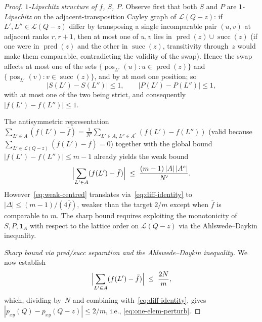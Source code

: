 \begin{proof}
\smallskip\noindent\emph{$1$-Lipschitz structure of $f$, $S$, $P$.}
Observe first that both $S$ and $P$ are \emph{$1$-Lipschitz} on the
adjacent-transposition Cayley graph of $\mathcal L(Q-z)$: if
$L', L'' \in \mathcal L(Q-z)$ differ by transposing a single
incomparable pair $(u, v)$ at adjacent ranks $r, r+1$, then at most
one of $u, v$ lies in $\operatorname{pred}(z) \cup \operatorname{succ}(z)$
(if one were in $\operatorname{pred}(z)$ and the other in
$\operatorname{succ}(z)$, transitivity through~$z$ would make them
comparable, contradicting the validity of the swap). Hence the swap
affects at most one of the sets
$\{\operatorname{pos}_{L'}(u) : u \in \operatorname{pred}(z)\}$ and
$\{\operatorname{pos}_{L'}(v) : v \in \operatorname{succ}(z)\}$, and
by at most one position; so
\begin{equation}\label{eq:fS-fP-lipschitz}
  |S(L') - S(L'')| \le 1,\qquad |P(L') - P(L'')| \le 1,
\end{equation}
with at most one of the two being strict, and consequently
$|f(L') - f(L'')| \le 1$.

The antisymmetric representation
$\sum_{L' \in A}(f(L') - \bar f) = \frac{1}{N'}\sum_{L' \in A,\,L'' \in A^c}(f(L') - f(L''))$
(valid because $\sum_{L' \in \mathcal L(Q-z)}(f(L') - \bar f) = 0$)
together with the global bound $|f(L') - f(L'')| \le m - 1$ already
yields the weak bound
\begin{equation}\label{eq:weak-centred}
  \Bigl|\sum_{L' \in A}(f(L') - \bar f)\Bigr|
  \;\le\; \frac{(m-1)\,|A|\,|A^c|}{N'}.
\end{equation}
However~\eqref{eq:weak-centred} translates via~\eqref{eq:diff-identity}
to $|\Delta| \le (m-1)/(4\bar f)$, weaker than the target $2/m$ except
when $\bar f$ is comparable to $m$. The sharp bound requires
exploiting the monotonicity of $S, P, \mathbf{1}_A$ with respect to
the lattice order on $\mathcal L(Q-z)$ via the Ahlswede--Daykin
inequality.

\smallskip\noindent\emph{Sharp bound via pred/succ separation and the
Ahlswede--Daykin inequality.} We now establish
\begin{equation}\label{eq:sharp-centred}
  \Bigl|\sum_{L' \in A}(f(L') - \bar f)\Bigr| \;\le\; \frac{2N}{m},
\end{equation}
which, dividing by~$N$ and combining with~\eqref{eq:diff-identity},
gives $|p_{xy}(Q) - p_{xy}(Q-z)| \le 2/m$, i.e.,
\eqref{eq:one-elem-perturb}.


\end{proof}
